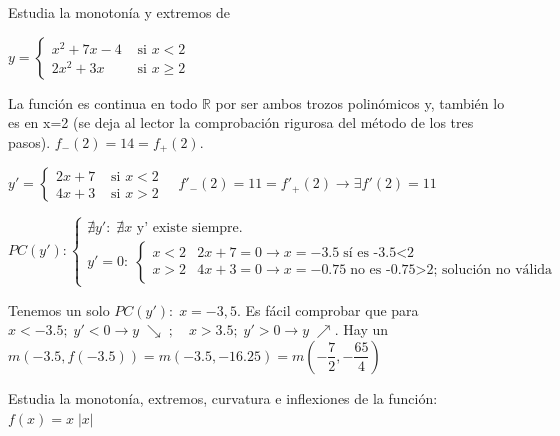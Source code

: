 	\begin{ejre}
	Estudia la monotonía y extremos de 
	
	$y=\begin{cases}
	   x^2+7x-4 & \mbox{ si } x<2  \\
	  2x^2+3x & \mbox{ si } x\ge 2
	\end{cases}$	
	\end{ejre}

	\begin{proofw}\renewcommand{\qedsymbol}{$\diamond$}
	
	La función es continua en todo $\mathbb R$ por ser ambos trozos polinómicos y, también lo es en x=2 (se deja al lector la comprobación rigurosa del método de los tres pasos). $f_-(2)=14=f_+(2)$.
	
	 $y'=\begin{cases}
	   2x+7 & \mbox{ si } x<2  \\
	 4x+3 & \mbox{ si } x> 2
	\end{cases} \quad f'_-(2)=11=f'_+(2) \to \exists f'(2)=11 $
	
	\noindent \footnotesize{$PC(y'): \begin{cases}
 	\nexists y': \; \nexists x \mbox{ y' existe siempre.}\\
 	y'=0: \; \begin{cases}
 	x<2 & 2x+7=0 \to x=-3.5 \; \mbox{sí es -3.5<2} \\
 	x>2 &4x+3=0 \to x=-0.75  \; \mbox{no es -0.75>2; solución no  válida}
 	\end{cases}
 	\end{cases}$}
	
	\normalsize{Tenemos} un solo $PC(y'):\; x=-3,5$. Es fácil comprobar que para $x<-3.5; \; y'<0 \to y\; \searrow \; ; \quad x>3.5; \; y'>0 \to y \;  \nearrow$. Hay un $m(-3.5,f(-3.5))=m(-3.5, -16.25)=m\left(-\dfrac 7 2, -\dfrac {65}4 \right)$
	\end{proofw}
	
	\begin{ejre} Estudia la monotonía, extremos, curvatura e inflexiones de la función: $f(x)=x\; |x|$
		
	\end{ejre}
	

